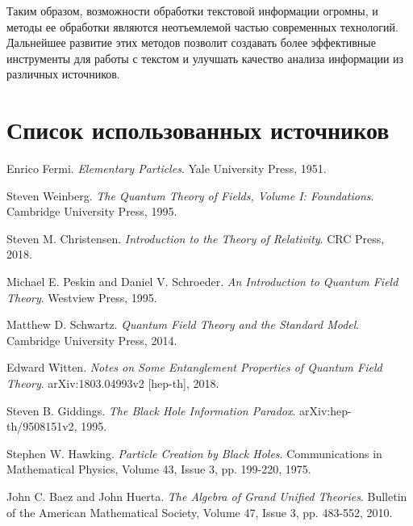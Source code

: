 \documentclass[draft]{article}
\begin{document}
Таким образом, возможности обработки текстовой информации огромны, и методы ее обработки являются неотъемлемой частью современных технологий. Дальнейшее развитие этих методов позволит создавать более эффективные инструменты для работы с текстом и улучшать качество анализа информации из различных источников.\newpage\section{Список использованных источников}
\begin{thebibliography}{9}
 Enrico Fermi. \textit{Elementary Particles}. Yale University Press, 1951.

 Steven Weinberg. \textit{The Quantum Theory of Fields, Volume I: Foundations}. Cambridge University Press, 1995.

 Steven M. Christensen. \textit{Introduction to the Theory of Relativity}. CRC Press, 2018.

 Michael E. Peskin and Daniel V. Schroeder. \textit{An Introduction to Quantum Field Theory}. Westview Press, 1995.

 Matthew D. Schwartz. \textit{Quantum Field Theory and the Standard Model}. Cambridge University Press, 2014.

 Edward Witten. \textit{Notes on Some Entanglement Properties of Quantum Field Theory}. arXiv:1803.04993v2 [hep-th], 2018.

 Steven B. Giddings. \textit{The Black Hole Information Paradox}. arXiv:hep-th/9508151v2, 1995.

 Stephen W. Hawking. \textit{Particle Creation by Black Holes}. Communications in Mathematical Physics, Volume 43, Issue 3, pp. 199-220, 1975.

 John C. Baez and John Huerta. \textit{The Algebra of Grand Unified Theories}. Bulletin of the American Mathematical Society, Volume 47, Issue 3, pp. 483-552, 2010.

\end{thebibliography}
\end{document}
